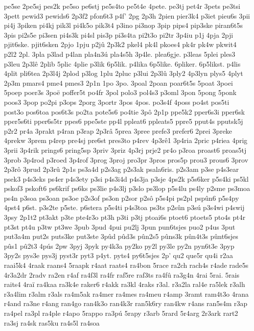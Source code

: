 {pe5se
2pe5sj
pes2k
pe5so
pe6stj
pe5s4to
pe5t4e
4pete.
pe3tj
pet4r
3pets
pe3tsi
3pett
pewid3
pewids6
2p3f2
pfon6t3
p4f'
2pg
2p3h
2pien
pier3k4
p3iet
pieu6s
3pii
pi4j
3piken
pi4kj
pik3l
pi4k5o
pik3t4
p3ino
pi3nop
3pip
pips4
pip3ske
piran6t5s
3pis
pi2s5e
pi3sen
pi4s3k
pi4sl
pis3p
pi3s4ta
pi2t3o
pi2tr
3p4iu
p1j
4pja
2pji
pjit6ske.
pjit6sken
2pjo
1pju
p2jû
2p3k2
pkel4
pk4l
pkoes4
pk4r
pk4w
pkwit4
p2l2
2pl.
3pla
p3lad
p4lan
pla4n3ú
pla4s5h
3p4le.
plea6gje.
p3leas
5plei
ples3
p3leu
2p3lê
2plib
5plic
4plie
p3lik
6p5lik.
p4lika
6p5like.
6pliker.
6p5likst.
p4lis
4plit
pli6tea
2p3l4j
2plod
p3log
1plu
2pluc
p3lui
2p3lû
3ply2
4p3lyn
plys5
4plyt
2p3m
pmars4
pme4
pmes3
2p1n
1po
3po.
3poal
2poan
poar6t5s
5poat
3poei
5poep
poer3s
3poë
poffer5t
po4fr
3pol
polo3
pol4s3
p3oml
3pon
5pong
5ponk
poos3
3pop
po2pi
p3ops
2porg
3portr
3pos
4pos.
po3s4f
4poss
po4st
pos5ti
post3o
pos6toa
pos6t3s
po2ta
pote5s6
po4tie
3pô
2p1p
ppe5k2
pper6s3i
pper6sk
pper5s6ti
pper6s5tr
ppes6
ppe5ste
pp4l
ppleat6
ppleats5
ppre5
pput4s
pputsk5j
p2r2
pr4a
3prakt
p4ran
p3rap
2p3râ
5prea
3pree
prefe3
prefer6
2prei
3preke
4prekw
3prem
p4rep
pre4sj
pre6st
pres3to
p4rev
4p3rê1
3p4ria
2pric
p4riea
4prig
3prii
3p4rik
prings6
pring5sp
3priv
3priz
4p3rj
prje2
pr4o
p3roa
proast6
proas5tj
3prob
3p4rod
p3roed
3p4rof
3prog
3proj
pro3pr
3pros
pros5p
prou3
prous6
3prov
2p3rô
3prud
2p3rû
2p1s
ps3a4d
p2s3ag
p2s3ak
psala6ris.
p2s3am
p3se
p4s3ear
psek3
p4s3eks
ps4er
p4s3ety
p3si
p4s3i4d
p4s3ja
p3sje
4ps2k
p5s6ker
p5s4ki
ps5kl
pskof3
pskoft6
ps6krif
ps6ks
ps3lie
p4s3lj
p3slo
ps3lop
p5s4lu
ps4ly
p2sme
ps3moa
ps4n
p3soa
ps3oan
ps3oe
p2s3of
ps3on
p2sor
p2sô
p5s4pi
ps2pl
pspûn6
p5s4py
4pst4
p6st.
p3s2te
p5ste.
p6stera
p5s4ti
p4s3toa
ps3ts
p2sûn
p3sú
p3s4wi
p4swij
3psy
2p1t2
pt3akt
p3te
pte4r3o
pt3h
p3ti
p3tj
ptoai6s
ptoet6
ptoets5
pto4s
pt4r
pt3st
pt4u
p3tw
pt3we
3pub
3pud
4pui
pu2lj
3pun
pun6tsjes
puo2
p4us
3put
put3a4m
put2s
puts3ke
put3ste
3pûd
pûd3s
pûn2s5
pûns3k
pûn4t3s
pûnt6sjes
pûs1
pû2t3
4pús
2pw
3pyj
3pyk
py4k3a
py2ko
py2l
py3le
py2n
pyn6t3e
3pyp
3py2s
pys3e
pys3j
pyst3r
pyt3
p4yt.
pyts4
py6t5sjes
2p'
qu2
que5r
qu4i
r2aa
raai5k4
4raak
raans4
5raapk
r4aat
raats4
ra4bon
5race
ra2ch
rach4s
r4ade
rade5s
4r3a2dr
2radv
ra2en
r4af
ra4f3l
ra4fr
raf5re
raf3ts
ra4fû
ra3g4n
4rai
5rai.
5rais
raits4
4raï
ra4kaa
ra3k4e
raker6
r4akk
ra3kl
4raks
r3al.
r3a2la
ral4e
ra5lek
r3alh
r3a4lim
r3alm
r3als
ra4m5ak
ra4mer
ra4mes
ra4meu
r4amp
3ramt
ram4t3o
4rana
r4and
ra3ne
r4ang
ran4go
ran4k3o
ran4k3r
ran5k6ry
ran4kw
r4ans
ran5s4m
r3ap
ra4pel
ra3pl
ra4ple
r4apo
5rappo
ra3pú
5rapy
r3arb
5rard
5r4arg
2r3ark
rart2
ra3sj
ra4sk
ras5ku
ra4s5l
ra4soa
}
